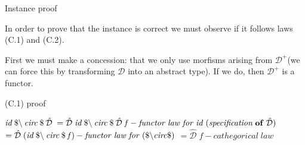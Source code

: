 \documentclass{beamer}
\newcommand{\Varid}[1]{\mathit{#1}}
\begin{document}
\begin{frame}{Instance proof}

In order to prove that the instance is correct we must observe if it follows laws (C.1) and (C.2).

First we must make a concession: that we only use morfisms arising from \ensuremath{\mathcal{D}^{+}}(we can force this by transforming \ensuremath{\mathcal{D}} into an abstract type).
If we do, then \ensuremath{\mathcal{D}^{+}} is a functor.


\begin{block}{(C.1) proof}

\ensuremath{\Varid{id}\mathbin{\$\char92 }\Varid{circ}\mathbin{\$}\mathcal{\hat{D}}}
\ensuremath{\mathrel{=}\mathcal{\hat{D}}\;\Varid{id}\mathbin{\$\char92 }\Varid{circ}\mathbin{\$}\mathcal{\hat{D}}\;\Varid{f}\mathbin{-}\Varid{functor}\;\Varid{law}\;\Varid{for}\;\Varid{id}\;(\Varid{specification}\;\mathbf{of}\;\mathcal{\hat{D}})}
\ensuremath{\mathrel{=}\mathcal{\hat{D}}\;(\Varid{id}\mathbin{\$\char92 }\Varid{circ}\mathbin{\$}\Varid{f})\mathbin{-}\Varid{functor}\;\Varid{law}\;\Varid{for}\;(\mathbin{\$\char92 }\Varid{circ}\mathbin{\$})}
\ensuremath{\mathrel{=}\mathcal{\hat{D}}\;\Varid{f}\mathbin{-}\Varid{cathegorical}\;\Varid{law}}
\end{block}

\end{frame}
\end{document}
